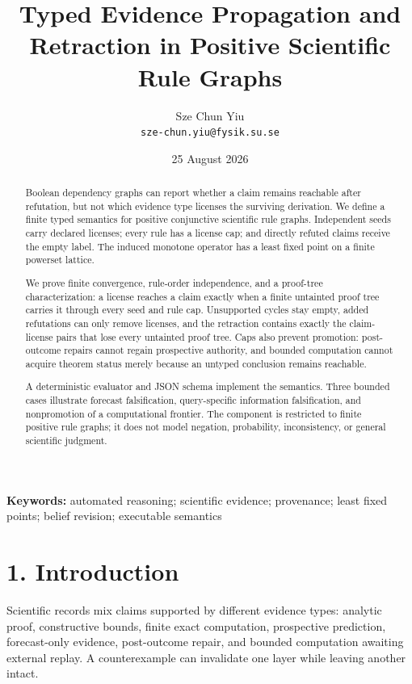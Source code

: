 \documentclass[
  11pt,
]{article}
\title{Typed Evidence Propagation and Retraction in Positive Scientific Rule Graphs}
\author{Sze Chun Yiu\\\texttt{sze-chun.yiu@fysik.su.se}}
\date{25 August 2026}
\begin{document}
\maketitle

\begin{abstract}
Boolean dependency graphs can report whether a claim remains reachable
after refutation, but not which evidence type licenses the surviving
derivation. We define a finite typed semantics for positive conjunctive
scientific rule graphs. Independent seeds carry declared licenses; every
rule has a license cap; and directly refuted claims receive the empty
label. The induced monotone operator has a least fixed point on a finite
powerset lattice.

We prove finite convergence, rule-order independence, and a proof-tree
characterization: a license reaches a claim exactly when a finite
untainted proof tree carries it through every seed and rule cap.
Unsupported cycles stay empty, added refutations can only remove
licenses, and the retraction contains exactly the claim-license pairs
that lose every untainted proof tree. Caps also prevent promotion:
post-outcome repairs cannot regain prospective authority, and bounded
computation cannot acquire theorem status merely because an untyped
conclusion remains reachable.

A deterministic evaluator and JSON schema implement the semantics. Three
bounded cases illustrate forecast falsification, query-specific
information falsification, and nonpromotion of a computational frontier.
The component is restricted to finite positive rule graphs; it does not
model negation, probability, inconsistency, or general scientific
judgment.

\end{abstract}

\noindent\textbf{Keywords:} automated reasoning; scientific evidence; provenance;
least fixed points; belief revision; executable semantics

\hypertarget{introduction}{%
\section{1. Introduction}\label{introduction}}

Scientific records mix claims supported by different evidence types:
analytic proof, constructive bounds, finite exact computation,
prospective prediction, forecast-only evidence, post-outcome repair, and
bounded computation awaiting external replay. A counterexample can
invalidate one layer while leaving another intact.
\end{document}
